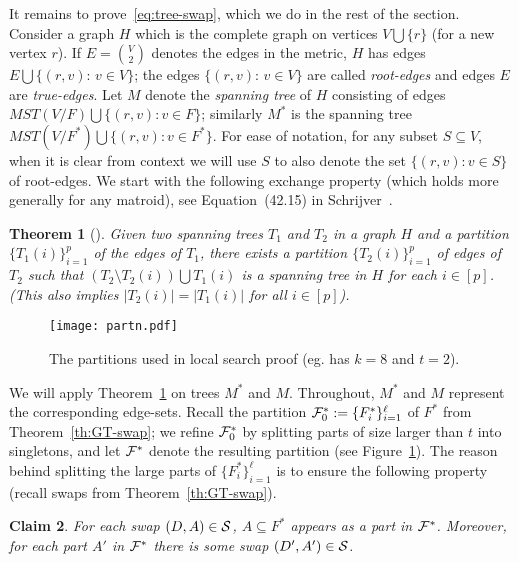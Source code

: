 \documentclass[11pt,twoside,a4paper]{article}
\newtheorem{theorem}{Theorem}
\newtheorem{claim}[theorem]{Claim}
\newcommand{\sse}{\subseteq}
\begin{document}
It remains to prove~\eqref{eq:tree-swap}, which we do in the rest of the section. Consider a graph $H$ which is the
complete graph on vertices $V\bigcup\{r\}$ (for a new vertex $r$). If $E={V\choose 2}$ denotes the edges in the metric,
$H$ has edges $E \bigcup \{(r,v) :\, v\in V\}$; the edges $\{(r,v) :\, v\in V\}$ are called {\em root-edges} and edges
$E$ are {\em true-edges}. Let $M$ denote the {\em spanning tree} of $H$ consisting of edges $MST(V/F) \bigcup \{(r,v) :
v\in F\}$; similarly $M^*$ is the spanning tree $MST(V/F^*) \bigcup \{(r,v) : v\in F^*\}$. For ease of notation, for
any subset $S\sse V$, when it is clear from context we will use $S$ to also denote the set $\{(r,v) : v\in S\}$ of
root-edges. We start with the following exchange property (which holds more generally for any matroid), see
Equation~(42.15) in Schrijver~\cite{Schr-book}.
\begin{theorem}[\cite{Schr-book}]\label{th:mat-exch}
Given two spanning trees $T_1$ and $T_2$ in a graph $H$ and a partition $\{T_1(i)\}_{i=1}^p$ of the edges of $T_1$,
there exists a partition $\{T_2(i)\}_{i=1}^p$ of edges of $T_2$ such that $(T_2\setminus T_2(i)) \bigcup T_1(i)$ is a
spanning tree in $H$ for each $i\in[p]$. (This also implies $|T_2(i)|=|T_1(i)|$ for all $i\in[p]$).
\end{theorem}


\begin{figure}
\begin{center}
\texttt{[image: partn.pdf]}
\caption{The partitions used in local search proof (eg. has $k=8$ and $t=2$).\label{fig:partn}}
\end{center}
\end{figure}


We will apply Theorem~\ref{th:mat-exch} on trees $M^*$ and $M$. Throughout, $M^*$ and $M$ represent the corresponding
edge-sets. Recall the partition $\mathcal{F}^*_0 := \{F^*_i\}_{i=1}^\ell$ of $F^*$ from Theorem~\ref{th:GT-swap}; we refine
$\mathcal{F}^*_0$ by splitting parts of size larger than $t$ into singletons, and let $\mathcal{F}^*$ denote the resulting partition (see
Figure~\ref{fig:partn}). The reason behind splitting the large parts of $\{F^*_i\}_{i=1}^\ell$ is to ensure the
following property (recall swaps \swap from Theorem~\ref{th:GT-swap}).
\begin{claim}\label{cl:fstar-partn}
For each swap $(D,A)\in\mathcal{S}$, $A\sse F^*$ appears as a part in $\mathcal{F}^*$. Moreover, for each part $A'$ in $\mathcal{F}^*$ there is
some swap $(D',A')\in\mathcal{S}$.
\end{claim}
\end{document}
